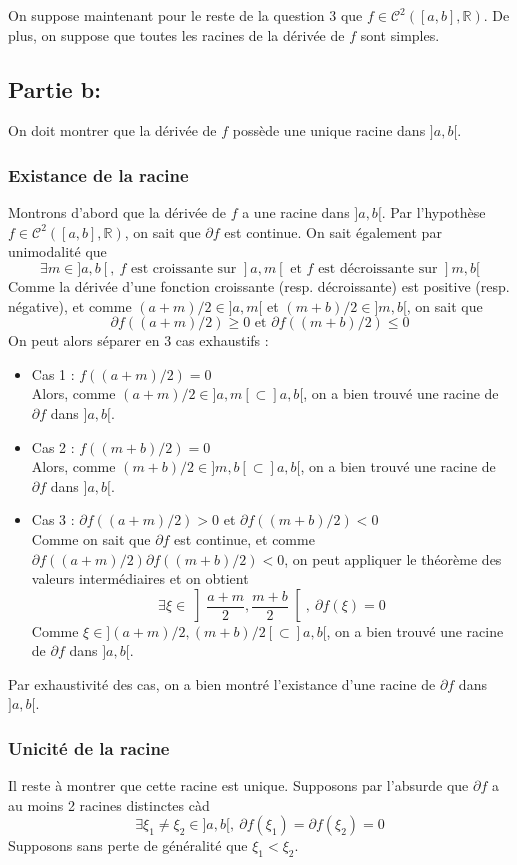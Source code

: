 \documentclass[a4paper, 12pt]{article}
\begin{document}
\newpage

On suppose maintenant pour le reste de la question 3 que \( f \in \mathcal{C}^{2}([a, b], \mathbb{R}) \). De plus, on suppose que toutes les racines de la dérivée de \( f \) sont simples.

\subsection{Partie b:}

On doit montrer que la dérivée de \( f \) possède une unique racine dans \( ]a, b[ \).

\subsubsection{Existance de la racine}

Montrons d'abord que la dérivée de \( f \) a une racine dans \( ]a, b[ \). Par l'hypothèse \( f \in \mathcal{C}^{2}([a, b], \mathbb{R}) \), on sait que \( \partial f \) est continue.
On sait également par unimodalité que
$$
\exists m \in ]a, b[,~ f \text{ est croissante sur } ]a, m[ \text{ et } f \text{ est décroissante sur } ]m, b[
$$
Comme la dérivée d'une fonction croissante (resp. décroissante) est positive (resp. négative), et comme \( (a+m)/2 \in ]a, m[ \) et \( (m+b)/2 \in ]m, b[ \), on sait que
$$
\partial f ((a+m)/2) \geq 0 \text{ et } \partial f((m+b)/2) \leq 0
$$
On peut alors séparer en 3 cas exhaustifs :
\begin{itemize}
    \item Cas 1 : \( f ((a+m)/2) = 0 \) \\
    Alors, comme \( (a+m)/2 \in ]a, m[ \subset ]a, b[ \), on a bien trouvé une racine de \( \partial f \) dans \( ]a, b[ \).
    \item Cas 2 : \( f ((m+b)/2) = 0 \) \\
    Alors, comme \( (m+b)/2 \in ]m, b[ \subset ]a, b[ \), on a bien trouvé une racine de \( \partial f \) dans \( ]a, b[ \).
    \item Cas 3 : \( \partial f ((a+m)/2) > 0 \) et \( \partial f((m+b)/2) < 0 \) \\
    Comme on sait que \( \partial f \) est continue, et comme \( \partial f ((a+m)/2) \partial f((m+b)/2) < 0 \), on peut appliquer le théorème des valeurs intermédiaires et on obtient
    $$
    \exists \xi \in \left] \frac{a+m}{2}, \frac{m+b}{2} \right[,~ \partial f (\xi) = 0
    $$
    Comme \( \xi \in ](a+m)/2, (m+b)/2[ \subset ]a, b[ \), on a bien trouvé une racine de \( \partial f \) dans \( ]a, b[ \).
\end{itemize}
Par exhaustivité des cas, on a bien montré l'existance d'une racine de \( \partial f \) dans \( ]a, b[ \).

\subsubsection{Unicité de la racine}

Il reste à montrer que cette racine est unique. Supposons par l'absurde que \( \partial f \) a au moins 2 racines distinctes càd
$$
\exists \xi_1 \neq \xi_2 \in ]a, b[,~ \partial f(\xi_1) = \partial f(\xi_2) = 0
$$
Supposons sans perte de généralité que \( \xi_1 < \xi_2 \).
\end{document}
